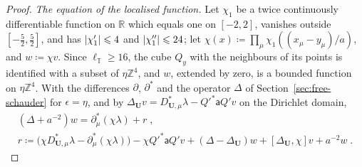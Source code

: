 \documentclass[11pt]{preprint}
\DeclarePairedDelimiter{\abs}{\lvert}{\rvert}
\numberwithin{equation}{section}
\begin{document}
\begin{proof}
\emph{The equation of the localised function.} Let $\chi_1$ be a twice continuously differentiable function on $\mathbb R$ which equals one on $[-2, 2]$, vanishes outside $[-\frac{5}{2}, \frac{5}{2}]$, and has $\abs{\chi_1'} \leqslant 4$ and $\abs{\chi_1''} \leqslant 24$; let $\chi(x) \coloneqq \prod_\mu\chi_1((x_\mu - y_\mu)/a)$, and $w \coloneqq \chi v$. Since $\ell_{\mathbb T} \geqslant 16$, the cube $Q_y$ with the neighbours of its points is identified with a subset of $\eta\mathbb Z^4$, and $w$, extended by zero, is a bounded function on $\eta\mathbb Z^4$. With the differences $\partial$, $\partial^*$ and the operator $\Delta$ of Section~\ref{sec:free-schauder} for $\epsilon = \eta$, and by $\Delta_{\mathbf U}v = D^*_{\mathbf U,\mu}\lambda - Q'^*\mathsf aQ'v$ on the Dirichlet domain,
\begin{equation}\label{eq:schauder-equation}
\begin{gathered}
    (\Delta + a^{-2})w = \partial^*_\mu(\chi\lambda) + r\;,\\
    r \coloneqq \bigl(\chi D^*_{\mathbf U,\mu}\lambda - \partial^*_\mu(\chi\lambda)\bigr) - \chi Q'^*\mathsf aQ'v + (\Delta - \Delta_{\mathbf U})w + [\Delta_{\mathbf U}, \chi]v + a^{-2}w\;.
\end{gathered}
\end{equation}

\end{proof}
\end{document}
